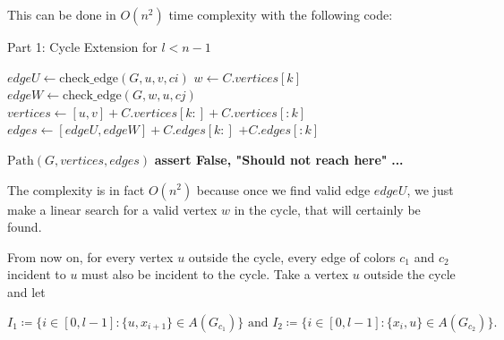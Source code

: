 This can be done in $O(n^2)$ time complexity with the following code:

\begin{algorithm}[H]
    \caption{Part 1: Cycle Extension for \( l < n - 1 \)}
    \begin{algorithmic}
            \For{$[ci, cj] \in [[c1, c2], [c2, c1]]$} 
                            \State $edgeU \gets \text{check\_edge}(G, u, v, ci)$
                                    \State $w \gets C.vertices[k]$
                                    \State $edgeW \gets \text{check\_edge}(G, w, u, cj)$
                                        \State $vertices \gets [u, v] + C.vertices[k:] + C.vertices[:k]$
                                        \State $edges \gets [edgeU, edgeW] + C.edges[k:]$
                                        \State \hspace{3em} $+ C.edges[:k]$
                                        
                                        \State \Return $\text{Path}(G, vertices, edges)$
                                    \EndIf
                                \EndFor
                                \State \textbf{assert False, "Should not reach here"}
                            \EndIf
                        \EndIf
                    \EndFor
                \EndFor
            \EndFor
            \State \textbf{...}
        \EndFunction
    \end{algorithmic}
\end{algorithm}

The complexity is in fact $O(n^2)$ because once we find valid edge $edgeU$, we 
just make a linear search for a valid vertex $w$ in the cycle, that will 
certainly be found.

From now on, for every vertex $u$ outside the cycle, every edge of colors $c_1$ and $c_2$ incident to 
$u$ must also be incident to the cycle. 
Take a vertex $u$ outside the cycle and let

$$
I_1 \coloneqq \{i \in [0, l - 1]: \{u, x_{i + 1}\} \in A(G_{c_1})\} \text{ and } I_2 \coloneqq \{i \in [0, l - 1]: \{x_i, u\} \in A(G_{c_2})\}.
$$

